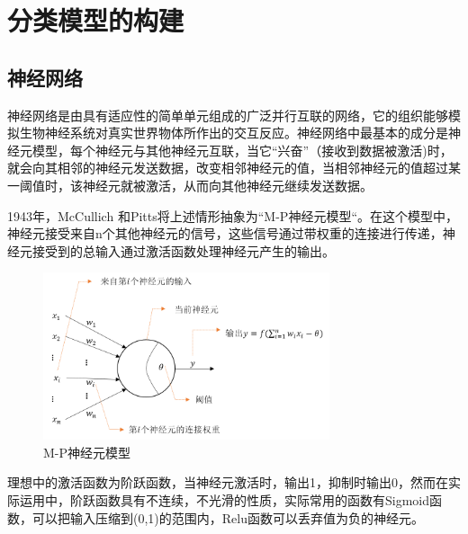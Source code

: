 \section{分类模型的构建}
\subsection{神经网络}
神经网络是由具有适应性的简单单元组成的广泛并行互联的网络，它的组织能够模拟生物神经系统对真实世界物体所作出的交互反应\cite{kohonen1988introduction}。神经网络中最基本的成分是神经元模型，每个神经元与其他神经元互联，当它“兴奋”（接收到数据被激活)时，就会向其相邻的神经元发送数据，改变相邻神经元的值，当相邻神经元的值超过某一阈值时，该神经元就被激活，从而向其他神经元继续发送数据。
\par 1943年，McCullich 和Pitts\cite{mcculloch1943logical}将上述情形抽象为“M-P神经元模型“。在这个模型中，神经元接受来自n个其他神经元的信号，这些信号通过带权重的连接进行传递，神经元接受到的总输入通过激活函数处理神经元产生的输出。
\begin{figure}[htbp]
	\begin{center}
		\includegraphics[width=0.75\textwidth]{figures/5-3}
		\caption{M-P神经元模型}
		\label{default}
	\end{center}
\end{figure}
\par 理想中的激活函数为阶跃函数，当神经元激活时，输出1，抑制时输出0，然而在实际运用中，阶跃函数具有不连续，不光滑的性质，实际常用的函数有Sigmoid函数，可以把输入压缩到(0,1)的范围内，Relu函数可以丢弃值为负的神经元。
